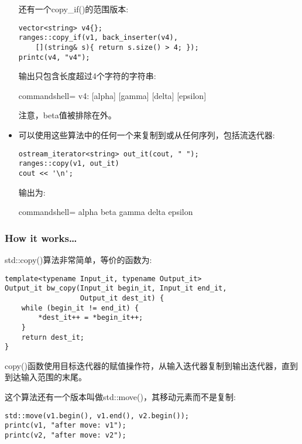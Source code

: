 \begin{itemize}
还有一个copy\_if()的范围版本:

\begin{lstlisting}[style=styleCXX]
vector<string> v4{};
ranges::copy_if(v1, back_inserter(v4),
	[](string& s){ return s.size() > 4; });
printc(v4, "v4");
\end{lstlisting}

输出只包含长度超过4个字符的字符串:

\begin{tcblisting}{commandshell={}}
v4: [alpha] [gamma] [delta] [epsilon]
\end{tcblisting}

注意，beta值被排除在外。

\item 
可以使用这些算法中的任何一个来复制到或从任何序列，包括流迭代器:

\begin{lstlisting}[style=styleCXX]
ostream_iterator<string> out_it(cout, " ");
ranges::copy(v1, out_it)
cout << '\n';
\end{lstlisting}

输出为:

\begin{tcblisting}{commandshell={}}
alpha beta gamma delta epsilon
\end{tcblisting}
\end{itemize}

\subsubsection{How it works…}

std::copy()算法非常简单，等价的函数为:

\begin{lstlisting}[style=styleCXX]
template<typename Input_it, typename Output_it>
Output_it bw_copy(Input_it begin_it, Input_it end_it,
				  Output_it dest_it) {
	while (begin_it != end_it) {
		*dest_it++ = *begin_it++;
	}
	return dest_it;
}
\end{lstlisting}

copy()函数使用目标迭代器的赋值操作符，从输入迭代器复制到输出迭代器，直到到达输入范围的末尾。

这个算法还有一个版本叫做std::move()，其移动元素而不是复制:

\begin{lstlisting}[style=styleCXX]
std::move(v1.begin(), v1.end(), v2.begin());
printc(v1, "after move: v1");
printc(v2, "after move: v2");
\end{lstlisting}


